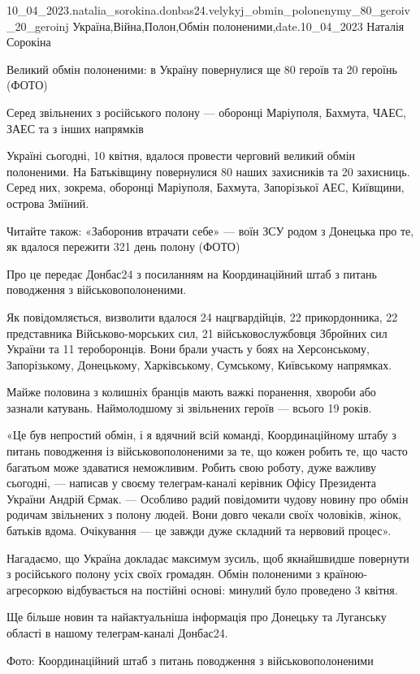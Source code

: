  
 
 
 
 

10_04_2023.natalia_sorokina.donbas24.velykyj_obmin_polonenymy_80_geroiv_20_geroinj
Україна,Війна,Полон,Обмін полоненими,date.10_04_2023
Наталія Сорокіна

Великий обмін полоненими: в Україну повернулися ще 80 героїв та 20 героїнь
(ФОТО)

Серед звільнених з російського полону — оборонці Маріуполя, Бахмута, ЧАЕС, ЗАЕС
та з інших напрямків

Україні сьогодні, 10 квітня, вдалося провести черговий великий обмін
полоненими. На Батьківщину повернулися 80 наших захисників та 20 захисниць.
Серед них, зокрема, оборонці Маріуполя, Бахмута, Запорізької АЕС, Київщини,
острова Зміїний.

Читайте також: «Заборонив втрачати себе» — воїн ЗСУ родом з Донецька про те, як
вдалося пережити 321 день полону (ФОТО)

Про це передає Донбас24 з посиланням на Координаційний штаб з питань поводження
з військовополоненими.

Як повідомляється, визволити вдалося 24 нацгвардійців, 22 прикордонника, 22
представника Військово-морських сил, 21 військовослужбовця Збройних сил України
та 11 тероборонців. Вони брали участь у боях на Херсонському, Запорізькому,
Донецькому, Харківському, Сумському, Київському напрямках.

Майже половина з колишніх бранців мають важкі поранення, хвороби або зазнали
катувань. Наймолодшому зі звільнених героїв — всього 19 років. 

«Це був непростий обмін, і я вдячний всій команді, Координаційному штабу з
питань поводження із військовополоненими за те, що кожен робить те, що часто
багатьом може здаватися неможливим. Робить свою роботу, дуже важливу сьогодні,
— написав у своєму телеграм-каналі керівник Офісу Президента України Андрій
Єрмак. — Особливо радий повідомити чудову новину про обмін родичам звільнених з
полону людей. Вони довго чекали своїх чоловіків, жінок, батьків вдома.
Очікування — це завжди дуже складний та нервовий процес».

Нагадаємо, що Україна докладає максимум зусиль, щоб якнайшвидше повернути з
російського полону усіх своїх громадян. Обмін полоненими з країною-агресоркою
відбувається на постійні основі: минулий було проведено 3 квітня.

Ще більше новин та найактуальніша інформація про Донецьку та Луганську області
в нашому телеграм-каналі Донбас24.

Фото: Координаційний штаб з питань поводження з військовополоненими
